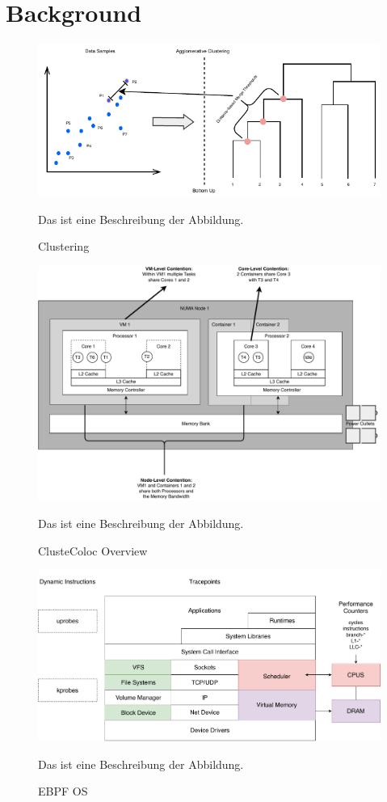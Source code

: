 \section{Background}
\label{cha:background}
\begin{figure}[H]
    \centering
    \includegraphics{fig/02/02-clustering.pdf}
    \caption{Clustering}
    \label{fig:02-clustering}
    \tiny
    Das ist eine Beschreibung der Abbildung.
\end{figure}

\begin{figure}[H]
    \centering
    \includegraphics[scale=0.5]{fig/02/02-coloc-overview.pdf}
    \caption{ClusteColoc Overview}
    \label{fig:02-coloc-overview}
    \tiny
    Das ist eine Beschreibung der Abbildung.
\end{figure}

\begin{figure}[H]
    \centering
    \includegraphics[scale=0.4]{fig/02/02-ebpf-os.pdf}
    \caption{EBPF OS}
    \label{fig:02-ebpf-os}
    \tiny
    Das ist eine Beschreibung der Abbildung.
\end{figure}


